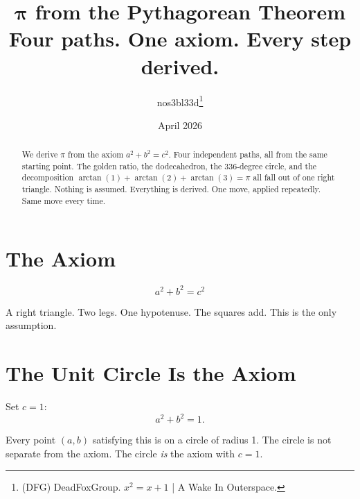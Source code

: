 \documentclass[11pt,a4paper]{article}
\theoremstyle{plain}
\theoremstyle{definition}
\begin{document}
\title{%
  \textbf{$\boldsymbol{\pi}$ from the Pythagorean Theorem}\\[4pt]
  \large Four paths. One axiom. Every step derived.%
}
\author{nos3bl33d\thanks{(DFG) DeadFoxGroup. $x^2 = x + 1$ | A Wake In Outerspace.}}
\date{April 2026}

\maketitle

\begin{abstract}
We derive $\pi$ from the axiom $a^2 + b^2 = c^2$. Four independent paths,
all from the same starting point. The golden ratio, the dodecahedron,
the 336-degree circle, and the decomposition $\arctan(1) + \arctan(2) + \arctan(3) = \pi$
all fall out of one right triangle. Nothing is assumed. Everything is derived.
One move, applied repeatedly. Same move every time.
\end{abstract}

\tableofcontents

\section{The Axiom}

\begin{equation}\label{eq:axiom}
  \boxed{\; a^2 + b^2 = c^2 \;}
\end{equation}

A right triangle. Two legs. One hypotenuse. The squares add.
This is the only assumption.

\section{The Unit Circle Is the Axiom}

Set $c = 1$:
\begin{equation}\label{eq:circle}
  a^2 + b^2 = 1.
\end{equation}

Every point $(a, b)$ satisfying this is on a circle of radius 1.
The circle is not separate from the axiom. The circle \emph{is} the axiom with $c = 1$.
\end{document}

